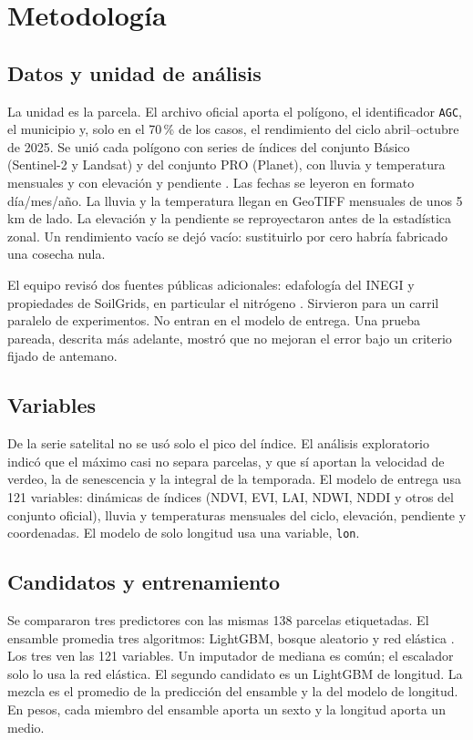 \section{Metodología}

\subsection{Datos y unidad de análisis}

La unidad es la parcela. El archivo oficial aporta el polígono, el identificador \texttt{AGC}, el municipio y, solo en el 70\,\% de los casos, el rendimiento del ciclo abril–octubre de 2025. Se unió cada polígono con series de índices del conjunto Básico (Sentinel-2 y Landsat) y del conjunto PRO (Planet), con lluvia y temperatura mensuales y con elevación y pendiente \citep{esa_s2,huete2002}. Las fechas se leyeron en formato día/mes/año. La lluvia y la temperatura llegan en GeoTIFF mensuales de unos 5 km de lado. La elevación y la pendiente se reproyectaron antes de la estadística zonal. Un rendimiento vacío se dejó vacío: sustituirlo por cero habría fabricado una cosecha nula.

El equipo revisó dos fuentes públicas adicionales: edafología del INEGI y propiedades de SoilGrids, en particular el nitrógeno \citep{inegi,poggio2021}. Sirvieron para un carril paralelo de experimentos. No entran en el modelo de entrega. Una prueba pareada, descrita más adelante, mostró que no mejoran el error bajo un criterio fijado de antemano.

\subsection{Variables}

De la serie satelital no se usó solo el pico del índice. El análisis exploratorio indicó que el máximo casi no separa parcelas, y que sí aportan la velocidad de verdeo, la de senescencia y la integral de la temporada. El modelo de entrega usa 121 variables: dinámicas de índices (NDVI, EVI, LAI, NDWI, NDDI y otros del conjunto oficial), lluvia y temperaturas mensuales del ciclo, elevación, pendiente y coordenadas. El modelo de solo longitud usa una variable, \texttt{lon}.

\subsection{Candidatos y entrenamiento}

Se compararon tres predictores con las mismas 138 parcelas etiquetadas. El ensamble promedia tres algoritmos: LightGBM, bosque aleatorio y red elástica \citep{ke2017,breiman2001,zou2005,pedregosa2011}. Los tres ven las 121 variables. Un imputador de mediana es común; el escalador solo lo usa la red elástica. El segundo candidato es un LightGBM de longitud. La mezcla es el promedio de la predicción del ensamble y la del modelo de longitud. En pesos, cada miembro del ensamble aporta un sexto y la longitud aporta un medio.

